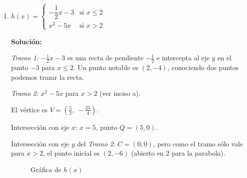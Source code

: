 \documentclass[12pt]{article}
\begin{document}
\begin{enumerate}[label=\alph*.-]
    \begin{enumerate}[label=\roman*.]
        \item $D_g = \mathbb{R}$ \quad e \quad $I_g = \left[-\dfrac{25}{2},\ +\infty\right)$
        \item $g(x)$ es \textbf{decreciente} en $\left(-\infty,\ -\dfrac{1}{2}\right)$ y \textbf{creciente} en $\left(-\dfrac{1}{2},\ +\infty\right)$.
    \end{enumerate}
 
    \newpage
 
    \item $h(x) = \begin{cases}
        -\dfrac{1}{2}x - 3 & \text{si } x \leq 2 \\[0.5em]
        x^2 - 5x & \text{si } x > 2
    \end{cases}$
 
    \textbf{Solución:}
 
    \textit{Tramo 1:} $-\tfrac{1}{2}x - 3$ es una recta de pendiente $-\tfrac{1}{2}$ e intercepta al eje $y$ en el punto $-3$ para $x \leq 2$.
    Un punto notable es $(2, -4)$, conociendo dos puntos podemos trazar la recta.
 
    \textit{Tramo 2:} $x^2 - 5x$ para $x > 2$ (ver inciso a).
    
    El vértice es $V = \left(\tfrac{5}{2},\ -\tfrac{25}{4}\right)$.

    Intersección con eje $x$: $x = 5$, punto $Q = (5, 0)$.

    Intersección con eje $y$ del \textit{Tramo 2}: $C = (0, 0)$, pero como el tramo sólo vale para $x > 2$, el punto inicial es $(2, -6)$ (abierto en $2$ para la parabola).
 
    \begin{figure}[H]
        \centering
        \caption{Gráfica de $h(x)$}
    \end{figure}
 

\end{enumerate}
\end{document}
